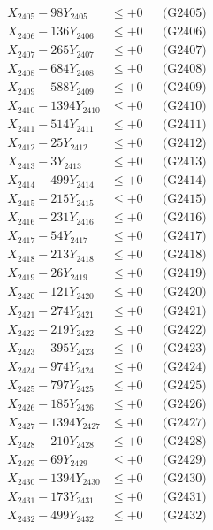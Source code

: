\documentclass[a4paper,10pt]{article}
\begin{document}
{\begin{align}
X_{2405} - 98Y_{2405} &\leq +0 && \text{(G2405)} \\
X_{2406} - 136Y_{2406} &\leq +0 && \text{(G2406)} \\
X_{2407} - 265Y_{2407} &\leq +0 && \text{(G2407)} \\
X_{2408} - 684Y_{2408} &\leq +0 && \text{(G2408)} \\
X_{2409} - 588Y_{2409} &\leq +0 && \text{(G2409)} \\
X_{2410} - 1394Y_{2410} &\leq +0 && \text{(G2410)} \\
\allowbreak
X_{2411} - 514Y_{2411} &\leq +0 && \text{(G2411)} \\
X_{2412} - 25Y_{2412} &\leq +0 && \text{(G2412)} \\
X_{2413} - 3Y_{2413} &\leq +0 && \text{(G2413)} \\
X_{2414} - 499Y_{2414} &\leq +0 && \text{(G2414)} \\
X_{2415} - 215Y_{2415} &\leq +0 && \text{(G2415)} \\
X_{2416} - 231Y_{2416} &\leq +0 && \text{(G2416)} \\
X_{2417} - 54Y_{2417} &\leq +0 && \text{(G2417)} \\
X_{2418} - 213Y_{2418} &\leq +0 && \text{(G2418)} \\
X_{2419} - 26Y_{2419} &\leq +0 && \text{(G2419)} \\
X_{2420} - 121Y_{2420} &\leq +0 && \text{(G2420)} \\
\allowbreak
X_{2421} - 274Y_{2421} &\leq +0 && \text{(G2421)} \\
X_{2422} - 219Y_{2422} &\leq +0 && \text{(G2422)} \\
X_{2423} - 395Y_{2423} &\leq +0 && \text{(G2423)} \\
X_{2424} - 974Y_{2424} &\leq +0 && \text{(G2424)} \\
X_{2425} - 797Y_{2425} &\leq +0 && \text{(G2425)} \\
X_{2426} - 185Y_{2426} &\leq +0 && \text{(G2426)} \\
X_{2427} - 1394Y_{2427} &\leq +0 && \text{(G2427)} \\
X_{2428} - 210Y_{2428} &\leq +0 && \text{(G2428)} \\
X_{2429} - 69Y_{2429} &\leq +0 && \text{(G2429)} \\
X_{2430} - 1394Y_{2430} &\leq +0 && \text{(G2430)} \\
\allowbreak
X_{2431} - 173Y_{2431} &\leq +0 && \text{(G2431)} \\
X_{2432} - 499Y_{2432} &\leq +0 && \text{(G2432)} \\

\end{align}}
\end{document}
